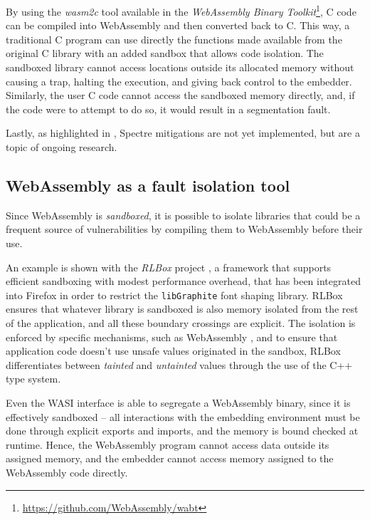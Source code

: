 By using the \textit{wasm2c} tool available in the \textit{WebAssembly Binary Toolkit}\footnote{\url{https://github.com/WebAssembly/wabt}},
C code can be compiled into WebAssembly and then converted back to C.
This way, a traditional C program can use directly the functions made available from the original C library with an added sandbox
that allows code isolation. The sandboxed library cannot access locations outside its allocated memory without causing a trap,
halting the execution, and giving back control to the embedder.
Similarly, the user C code cannot access the sandboxed memory directly, and, if the code were to attempt to do so,
it would result in a segmentation fault.

Lastly, as highlighted in \cite{wasmtime-security-sandboxing}, Spectre mitigations are not yet implemented, but are a topic of
ongoing research.

\subsection{WebAssembly as a fault isolation tool}

Since WebAssembly is \textit{sandboxed}, it is possible to isolate libraries that could be a frequent source of
vulnerabilities by compiling them to WebAssembly before their use.

An example is shown with the \textit{RLBox} project \cite{wasm-firefox-isolation-2020, rlbox-docs},
a framework that supports efficient sandboxing with modest performance overhead,
that has been integrated into Firefox in order to restrict the \texttt{libGraphite} font shaping library.
RLBox ensures that whatever library is sandboxed is also memory isolated from the rest of the application,
and all these boundary crossings are explicit. The isolation is enforced by specific mechanisms, such as
WebAssembly \cite{wasm-sandboxing-firefox}, and to ensure that application code doesn't use unsafe values
originated in the sandbox, RLBox differentiates between \textit{tainted} and \textit{untainted} values
through the use of the C++ type system.

Even the WASI interface is able to segregate a WebAssembly binary, since it is effectively sandboxed
-- all interactions with the embedding environment must be done through explicit exports and imports, and the memory is
bound checked at runtime. Hence, the WebAssembly program cannot access data outside its assigned memory, and the
embedder cannot access memory assigned to the WebAssembly code directly.

